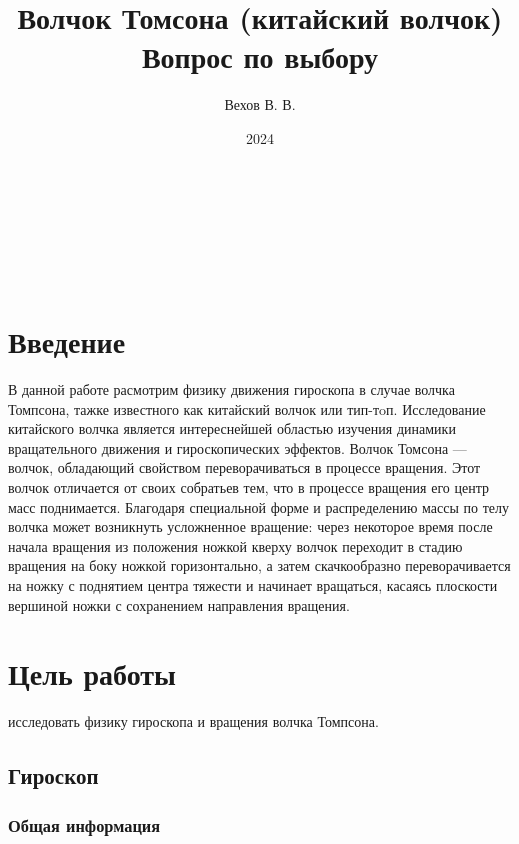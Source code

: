 \documentclass[a4paper, 12pt]{article}
\author{Вехов В. В.}
\title{Волчок Томсона (китайский волчок) \\ Вопрос по выбору}
\date{2024}
\begin{document}
\maketitle
\\\
\\\
\\\
\newpage

\tableofcontents{}
\newpage

\section{Введение}
В данной работе расмотрим физику движения гироскопа в случае волчка Томпсона, тажке известного как китайский волчок или тип-тoп.
Исследование китайского волчка является интереснейшей областью изучения динамики
вращательного движения и гироскопических эффектов. \newline
Волчок Томсона — волчок, обладающий свойством переворачиваться в процессе вращения. Этот волчок отличается от своих собратьев тем, что в процессе вращения его центр масс поднимается. Благодаря специальной форме и распределению массы по телу волчка может возникнуть усложненное вращение: через некоторое время после начала вращения из положения ножкой кверху волчок переходит в стадию вращения на боку ножкой горизонтально, а затем скачкообразно переворачивается на ножку с поднятием центра тяжести и начинает вращаться, касаясь плоскости вершиной ножки с сохранением направления вращения.


\section{Цель работы}
исследовать физику гироскопа и вращения волчка Томпсона.

\subsection{Гироскоп}

\subsubsection{Общая информация}
\end{document}
